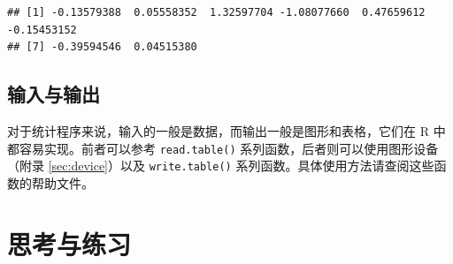 \documentclass[
  b5paper,
  UTF8,twoside]{book}
\begin{document}
\begin{verbatim}
## [1] -0.13579388  0.05558352  1.32597704 -1.08077660  0.47659612 -0.15453152
## [7] -0.39594546  0.04515380
\end{verbatim}

\hypertarget{ux8f93ux5165ux4e0eux8f93ux51fa}{%
\subsection{输入与输出}\label{ux8f93ux5165ux4e0eux8f93ux51fa}}

对于统计程序来说，输入的一般是数据，而输出一般是图形和表格，它们在 R 中都容易实现。前者可以参考 \texttt{read.table()} 系列函数，后者则可以使用图形设备（附录 \ref{sec:device}）以及 \texttt{write.table()} 系列函数。具体使用方法请查阅这些函数的帮助文件。

\hypertarget{ux601dux8003ux4e0eux7ec3ux4e60-7}{%
\section{思考与练习}\label{ux601dux8003ux4e0eux7ec3ux4e60-7}}
\end{document}
